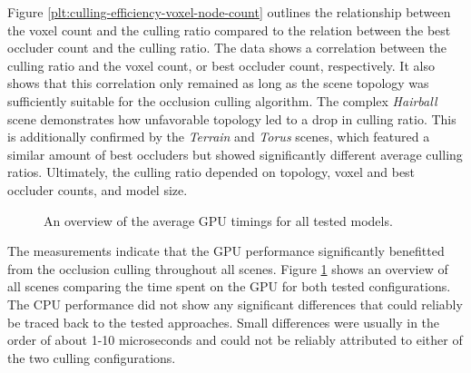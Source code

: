 \noindent
Figure \ref{plt:culling-efficiency-voxel-node-count} outlines the relationship between the voxel 
count and the culling ratio compared to the relation between the best occluder count and the culling 
ratio. The data shows a correlation between the culling ratio and the voxel count, or best occluder 
count, respectively. It also shows that this correlation only remained as long as the scene topology 
was sufficiently suitable for the occlusion culling algorithm. The complex \emph{Hairball} scene 
demonstrates how unfavorable topology led to a drop in culling ratio. This is additionally confirmed 
by the \emph{Terrain} and \emph{Torus} scenes, which featured a similar amount of best occluders 
but showed significantly different average culling ratios. Ultimately, the culling ratio depended 
on topology, voxel and best occluder counts, and model size. \\

\clearpage

\begin{figure}[!htb]    %
  \begin{center}
  \end{center}
  \caption{An overview of the average \ac{GPU} timings for all tested models.}
  \label{fig:gpu-performance-overview}
\end{figure}

\noindent
The measurements indicate that the \ac{GPU} performance significantly benefitted from the occlusion 
culling throughout all scenes. Figure \ref{fig:gpu-performance-overview} shows an overview of all 
scenes comparing the time spent on the \ac{GPU} for both tested configurations. The \ac{CPU} 
performance did not show any significant differences that could reliably be traced back to the 
tested approaches. Small differences were usually in the order of about 1-10 microseconds and could 
not be reliably attributed to either of the two culling configurations. \\

